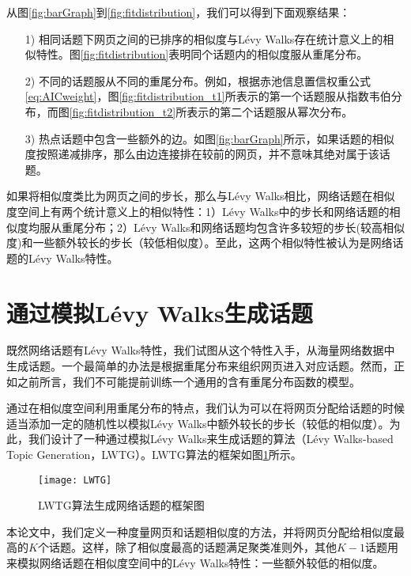 从图\ref{fig:barGraph}到\ref{fig:fitdistribution}，我们可以得到下面观察结果：
\begin{enumerate}
    \item[1)] 相同话题下网页之间的已排序的相似度与L\'evy Walks存在统计意义上的相似特性。图\ref{fig:fitdistribution}表明同个话题内的相似度服从重尾分布。
    \item[2)] 不同的话题服从不同的重尾分布。例如，根据赤池信息置信权重公式\ref{eq:AICweight}，图\ref{fig:fitdistribution_t1}所表示的第一个话题服从指数韦伯分布，而图\ref{fig:fitdistribution_t2}所表示的第二个话题服从幂次分布。
    \item[3)] 热点话题中包含一些额外的边。如图\ref{fig:barGraph}所示，如果话题的相似度按照递减排序，那么由边连接排在较前的网页，并不意味其绝对属于该话题。
\end{enumerate}

如果将相似度类比为网页之间的步长，那么与L\'evy Walks相比，网络话题在相似度空间上有两个统计意义上的相似特性：1）L\'evy Walks中的步长和网络话题的相似度均服从重尾分布；2）L\'{e}vy Walks和网络话题均包含许多较短的步长(较高相似度)和一些额外较长的步长（较低相似度）。至此，这两个相似特性被认为是网络话题的L\'evy Walks特性。

\section{通过模拟L\'evy Walks生成话题}

既然网络话题有L\'evy Walks特性，我们试图从这个特性入手，从海量网络数据中生成话题。一个最简单的办法是根据重尾分布来组织网页进入对应话题。然而，正如之前所言，我们不可能提前训练一个通用的含有重尾分布函数的模型。

通过在相似度空间利用重尾分布的特点，我们认为可以在将网页分配给话题的时候适当添加一定的随机性以模拟L\'evy Walks中额外较长的步长（较低的相似度）。为此，我们设计了一种通过模拟L\'evy Walks来生成话题的算法（L\'evy Walks-based Topic Generation，LWTG）。LWTG算法的框架如图\ref{fig:LWTG}所示。
\begin{figure}[!htbp]
    \centering
    \texttt{[image: LWTG]}
    \caption{LWTG算法生成网络话题的框架图}
    \label{fig:LWTG}
\end{figure}

本论文中，我们定义一种度量网页和话题相似度的方法，并将网页分配给相似度最高的$K$个话题。这样，除了相似度最高的话题满足聚类准则外，其他$K-1$话题用来模拟网络话题在相似度空间中的L\'evy Walks特性：一些额外较低的相似度。


